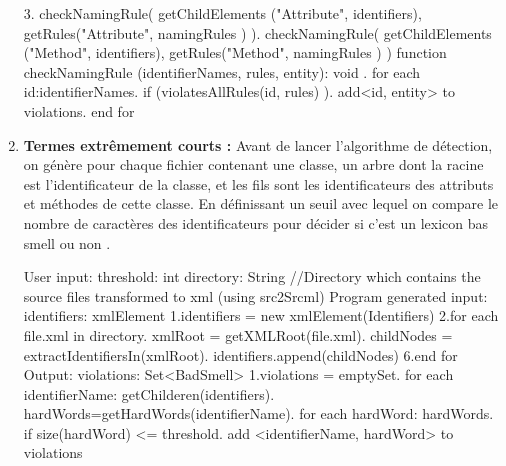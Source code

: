 \begin{enumerate}
\begin{framed}
{ 3. checkNamingRule( getChildElements ("Attribute", identifiers), getRules("Attribute", namingRules ) ). checkNamingRule( getChildElements ("Method", identifiers), getRules("Method", namingRules ) )\newline
  function checkNamingRule (identifierNames, rules, entity): void .    for each id:identifierNames.	    if (violatesAllRules(id, rules) ).		add<id, entity> to violations.    end for\newline
 }
\end{framed}
\newline
\item \textbf {	Termes extrêmement courts :}
Avant de lancer l'algorithme de détection, on génère pour chaque fichier contenant une classe, un arbre dont la racine est l'identificateur de la classe, et les fils sont les identificateurs des attributs et méthodes de cette classe.
En définissant un seuil avec lequel on compare le nombre de caractères des identificateurs pour décider si c'est un lexicon bas smell ou non    \cite{abebe2009lexicon}.
\begin{framed}
  {\selectfont  
User input:\newline
 threshold: int\newline
 directory: String //Directory which contains the source files transformed to xml (using src2Srcml)\newline
 Program generated input:\newline
 identifiers: xmlElement\newline
 1.identifiers = new xmlElement(Identifiers)\newline
 2.for each file.xml in directory.	xmlRoot = getXMLRoot(file.xml).	childNodes = extractIdentifiersIn(xmlRoot).	identifiers.append(childNodes)\newline
 6.end for\newline
 Output:\newline
 violations: Set<BadSmell>\newline
 1.violations = emptySet. for each identifierName: getChilderen(identifiers).	hardWords=getHardWords(identifierName).	for each hardWord: hardWords.	    if size(hardWord) <= threshold.	          add <identifierName, hardWord> to violations\newline
}
\end{framed}


\end{enumerate}
